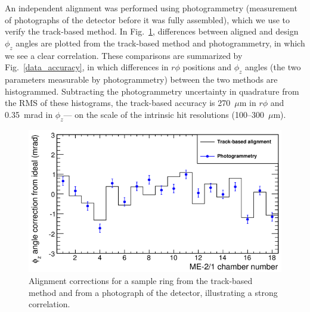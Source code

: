 An independent alignment was performed using photogrammetry
(measurement of photographs of the detector before it was fully
assembled), which we use to verify the track-based method.  In
Fig.~\ref{data_correlations}, differences between aligned and design
$\phi_z$ angles are plotted from the track-based method and
photogrammetry, in which we see a clear correlation.  These
comparisons are summarized by Fig.~\ref{data_accuracy}, in which
differences in $r\phi$ positions and $\phi_z$ angles (the two
parameters measurable by photogrammetry) between the two methods are
histogrammed.  Subtracting the photogrammetry uncertainty in
quadrature from the RMS of these histograms, the track-based accuracy
is 270~$\mu$m in $r\phi$ and 0.35~mrad in $\phi_z$--- on the scale of
the intrinsic hit resolutions (100--300~$\mu$m).

\begin{figure}
\centering
\includegraphics[width=0.9\linewidth]{data_correlations.eps}
\caption{Alignment corrections for a sample ring from the track-based method and from a photograph of the detector, illustrating a strong correlation.} \label{data_correlations}
\end{figure}

